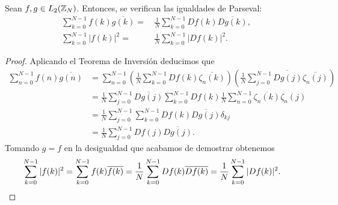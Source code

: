 \documentclass{article}
\begin{document}
\begin{proposition}
    Sean $f,g \in L_2(\mathbb{Z}_N)$. Entonces, se verifican las igualdades de Parseval:
    \begin{align*}
\sum_{k=0}^{N-1}f(k)\overline{g(k)} =\, &\frac{1}{N} \sum_{k=0}^{N-1}Df(k)\overline{Dg(k)},\\
\sum_{k=0}^{N-1} |f(k)|^2 = \, &\frac{1}{N} \sum_{k=0}^{N-1} |Df(k)|^2 .
    \end{align*}
\end{proposition}
\begin{proof}
    Aplicando el Teorema de Inversión deducimos que
        \begin{align*}
            \sum_{n=0}^{N-1}f(n)\overline{g(n)}  & = \sum_{n=0}^{N-1}\left( \frac{1}{N} \sum_{k=0}^{N-1} Df(k)\overline{ \zeta_n(k)} \right) \left( \frac{1}{N} \overline{\sum_{j=0}^{N-1} Dg(j)\overline{ \zeta_n(j)} } \right) \\
             & = \frac{1}{N} \sum_{j=0}^{N-1} \overline{Dg(j)} \sum_{k=0}^{N-1} Df(k) \frac{1}{N} \sum_{n=0}^{N-1}\overline{ \zeta_n(k)} \zeta_n(j) \\
             & = \frac{1}{N} \sum_{j=0}^{N-1} \sum_{k=0}^{N-1} Df(k) \overline{Dg(j)} \delta_{kj} \\
             & = \frac{1}{N} \sum_{j=0}^{N-1} Df(j) \overline{Dg(j)}.
        \end{align*}
    Tomando $g = f$ en la desigualdad que acabamos de demostrar obtenemos
        \begin{align*}
            \sum_{k=0}^{N-1} |f(k)|^2 = \sum_{k=0}^{N-1}f(k)\overline{f(k)} & = \frac{1}{N} \sum_{k=0}^{N-1}Df(k)\overline{Df(k)} = \frac{1}{N} \sum_{k=0}^{N-1} |Df(k)|^2.  \qedhere
        \end{align*}
\end{proof}
\end{document}
